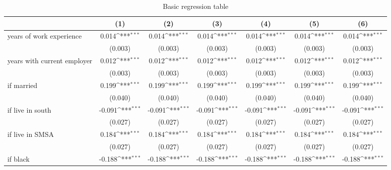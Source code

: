 \begin{table}[htbp]\centering
\def\sym#1{\ifmmode^{#1}\else\(^{#1}\)\fi}
\caption{Basic regression table \label{reg1}}
\begin{tabular}{l*{6}{c}}
\toprule
                    &\multicolumn{1}{c}{(1)}         &\multicolumn{1}{c}{(2)}         &\multicolumn{1}{c}{(3)}         &\multicolumn{1}{c}{(4)}         &\multicolumn{1}{c}{(5)}         &\multicolumn{1}{c}{(6)}         \\
\midrule
years of work experience&       0.014\sym{***}&       0.014\sym{***}&       0.014\sym{***}&       0.014\sym{***}&       0.014\sym{***}&       0.014\sym{***}\\
                    &     (0.003)         &     (0.003)         &     (0.003)         &     (0.003)         &     (0.003)         &     (0.003)         \\
\addlinespace
years with current employer&       0.012\sym{***}&       0.012\sym{***}&       0.012\sym{***}&       0.012\sym{***}&       0.012\sym{***}&       0.012\sym{***}\\
                    &     (0.003)         &     (0.003)         &     (0.003)         &     (0.003)         &     (0.003)         &     (0.003)         \\
\addlinespace
=1 if married       &       0.199\sym{***}&       0.199\sym{***}&       0.199\sym{***}&       0.199\sym{***}&       0.199\sym{***}&       0.199\sym{***}\\
                    &     (0.040)         &     (0.040)         &     (0.040)         &     (0.040)         &     (0.040)         &     (0.040)         \\
\addlinespace
=1 if live in south &      -0.091\sym{***}&      -0.091\sym{***}&      -0.091\sym{***}&      -0.091\sym{***}&      -0.091\sym{***}&      -0.091\sym{***}\\
                    &     (0.027)         &     (0.027)         &     (0.027)         &     (0.027)         &     (0.027)         &     (0.027)         \\
\addlinespace
=1 if live in SMSA  &       0.184\sym{***}&       0.184\sym{***}&       0.184\sym{***}&       0.184\sym{***}&       0.184\sym{***}&       0.184\sym{***}\\
                    &     (0.027)         &     (0.027)         &     (0.027)         &     (0.027)         &     (0.027)         &     (0.027)         \\
\addlinespace
=1 if black         &      -0.188\sym{***}&      -0.188\sym{***}&      -0.188\sym{***}&      -0.188\sym{***}&      -0.188\sym{***}&      -0.188\sym{***}\\

\end{tabular}
\end{table}
